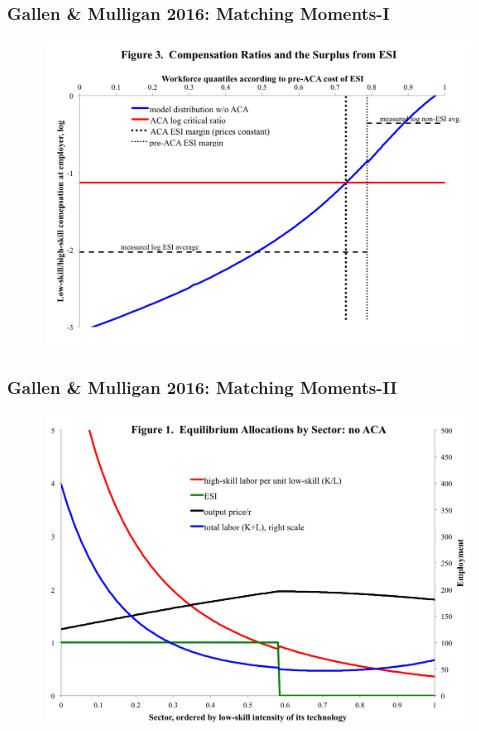 \documentclass{beamer}
\begin{document}
\begin{frame}
\frametitle[alignment=center]{Gallen \& Mulligan 2016: Matching Moments-I}
\begin{figure}
\centering
\includegraphics[scale=0.42]{Figures/CompensationRatios.png}
\end{figure}
\end{frame}

\begin{frame}
\frametitle[alignment=center]{Gallen \& Mulligan 2016: Matching Moments-II}
\begin{figure}
\centering
\includegraphics[scale=0.42]{Figures/Fig1.png}
\end{figure}
\end{frame}
\end{document}
